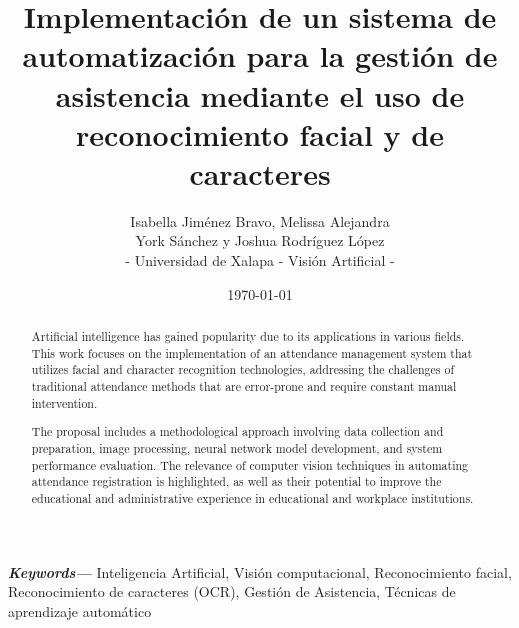 \documentclass[12pt, letterpaper]{article}
\title{Implementación de un sistema de automatización para la gestión de asistencia mediante el uso de reconocimiento facial y de caracteres}
\author{
    Isabella Jiménez Bravo, Melissa Alejandra \\
    York Sánchez y Joshua Rodríguez López\\
    \small -  Universidad de Xalapa
    \small - Visión Artificial  -
}
\date{\today}
\providecommand{\keywords}[1]
{
  \small	
  \textbf{\textit{Keywords---}} #1
}
\begin{document}
\maketitle



\keywords{Inteligencia Artificial, Visión computacional, Reconocimiento facial, Reconocimiento de caracteres (OCR), Gestión de Asistencia, Técnicas de aprendizaje automático}


\renewcommand{\abstractname}{Abstract}
\begin{abstract}
Artificial intelligence has gained popularity due to its applications in various fields. This work focuses on the implementation of an attendance management system that utilizes facial and character recognition technologies, addressing the challenges of traditional attendance methods that are error-prone and require constant manual intervention.

The proposal includes a methodological approach involving data collection and preparation, image processing, neural network model development, and system performance evaluation. The relevance of computer vision techniques in automating attendance registration is highlighted, as well as their potential to improve the educational and administrative experience in educational and workplace institutions.
\end{abstract}
\end{document}

